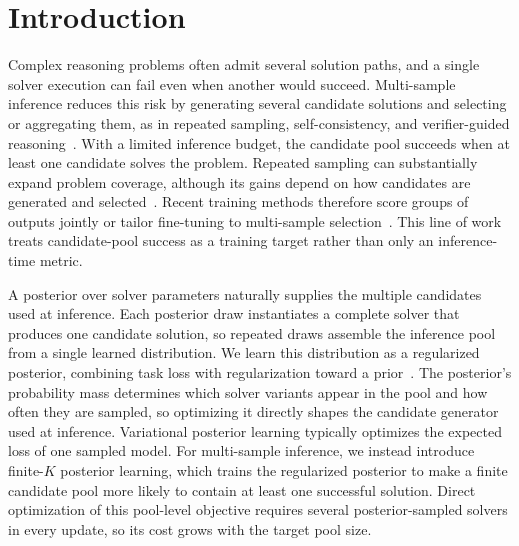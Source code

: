 \section{Introduction}
\label{sec:introduction}

Complex reasoning problems often admit several solution paths, and a single
solver execution can fail even when another would succeed. Multi-sample
inference reduces this risk by generating several candidate solutions and
selecting or aggregating them, as in repeated sampling, self-consistency, and
verifier-guided
reasoning~\citep{chen2021codex,wang2023selfconsistency,cobbe2021verifiers}.
With a limited inference budget, the candidate pool succeeds when at least one
candidate solves the problem. Repeated sampling can substantially expand
problem coverage, although its gains depend on how candidates are generated
and selected~\citep{brown2024monkeys,snell2024scaling,wu2025inferencescaling}.
Recent training methods therefore score groups of outputs jointly or tailor
fine-tuning to multi-sample
selection~\citep{pmlr-v267-tang25o,walder2025pkpo,chow2025inferenceaware,chen2025rethinking}.
This line of work treats candidate-pool success as a training target rather
than only an inference-time metric.

A posterior over solver parameters naturally supplies the multiple candidates
used at inference. Each posterior draw instantiates a complete solver that
produces one candidate solution, so repeated draws assemble the inference pool
from a single learned distribution. We learn this distribution as a
regularized posterior, combining task loss with regularization toward a
prior~\citep{bissiri2016general,blundell2015weight,shen2024variational}.
The posterior's probability mass determines which solver variants appear in
the pool and how often they are sampled, so optimizing it directly shapes the
candidate generator used at inference.
Variational posterior learning typically optimizes the expected loss of one
sampled model. For multi-sample inference, we instead introduce finite-$K$
posterior learning, which trains the regularized posterior to make a finite
candidate pool more likely to contain at least one successful solution. Direct
optimization of this pool-level objective requires several posterior-sampled
solvers in every update, so its cost grows with the target pool size.

